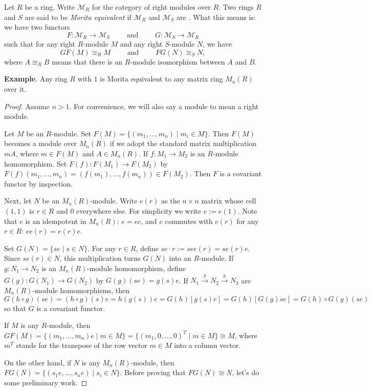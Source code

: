 \documentclass[12pt]{article}
\begin{document}
Let $R$ be a ring.  Write $\mathcal{M}_R$ for the category of right modules over $R$.  Two rings $R$ and $S$ are said to be \emph{Morita equivalent} if $\mathcal{M}_R$ and $\mathcal{M}_S$ are .  What this means is: we have two functors
$$F:\mathcal{M}_R\to \mathcal{M}_S\qquad\mbox{ and }\qquad G:\mathcal{M}_S\to \mathcal{M}_R$$
such that for any right $R$-module $M$ and any right $S$-module $N$, we have
$$GF(M)\cong_R M\qquad\mbox{ and }\qquad FG(N)\cong_S N,$$
where $A \cong_R B$ means that there is an $R$-module isomorphism between $A$ and $B$.

\textbf{Example}.  Any ring $R$ with $1$ is Morita equivalent to any matrix ring $M_n(R)$ over it.
\begin{proof}
Assume $n>1$.  For convenience, we will also say a module to mean a right module.  

Let $M$ be an $R$-module.  Set $F(M)=\lbrace (m_1,\ldots, m_n)\mid m_i\in M\rbrace$.  Then $F(M)$ becomes a module over $M_n(R)$ if we adopt the standard matrix multiplication $mA$, where $m\in F(M)$ and $A\in M_n(R)$.  If $f: M_1\to M_2$ is an $R$-module homomorphism.  Set $F(f):F(M_1)\to F(M_2)$ by $F(f)(m_1,\ldots,m_n)=(f(m_1),\ldots,f(m_n))\in F(M_2)$.  Then $F$ is a covariant functor by inspection.

Next, let $N$ be an $M_n(R)$-module.  Write $e(r)$ as the $n\times n$ matrix whose cell $(1,1)$ is $r\in R$ and $0$ everywhere else.  For simplicity we write $e:=e(1)$.  Note that $e$ is an idempotent in $M_n(R)$: $e=ee$, and $e$ commutes with $e(r)$ for any $r\in R$: $ee(r)=e(r)e$.

Set $G(N)=\lbrace se\mid s\in N \rbrace$.  For any $r\in R$, define $se\cdot r:= see(r)=se(r)e$.  Since $se(r)\in N$, this multiplication turns $G(N)$ into an $R$-module.  If $g:N_1\to N_2$ is an $M_n(R)$-module homomorphism, define $G(g): G(N_1)\to G(N_2)$ by $G(g)(se)=g(s)e$.  If $N_1\stackrel{g}{\longrightarrow} N_2\stackrel{h}{\longrightarrow} N_3$ are $M_n(R)$-module homomorphisms, then 
$$
G(h\circ g)(se)=(h\circ g)(s)e=h(g(s))e = G(h)[g(s)e]=G(h)[G(g)se]=G(h)\circ G(g)(se)
$$
so that $G$ is a covariant functor.

If $M$ is any $R$-module, then $GF(M)=\lbrace (m_1,\ldots,m_n)e\mid m\in M \rbrace = \lbrace (m_1,0,\ldots,0)^T\mid m\in M \rbrace \cong M$, where $m^T$ stands for the transpose of the row vector $m\in M$ into a column vector.

On the other hand, if $N$ is any $M_n(R)$-module, then $FG(N)=\lbrace (s_1e, \ldots, s_ne)\mid s_i\in N\rbrace$.  Before proving that $FG(N)\cong N$, let's do some preliminary work.


\end{proof}
\end{document}
